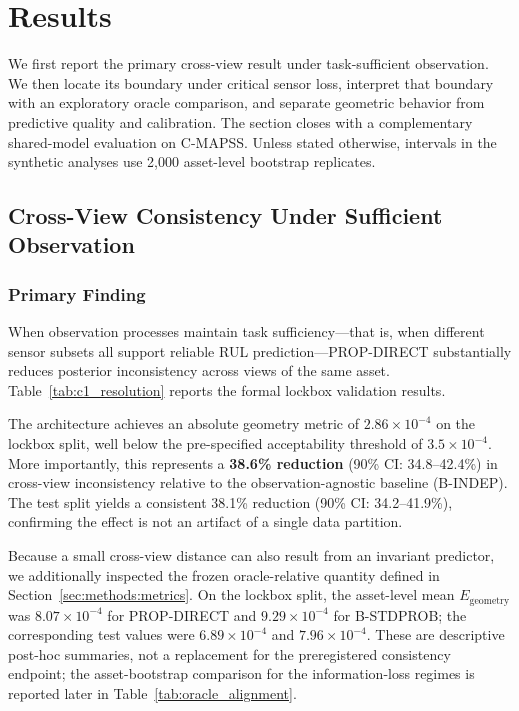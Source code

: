 
\section{Results}
\label{sec:results}

We first report the primary cross-view result under task-sufficient observation. We then locate its boundary under critical sensor loss, interpret that boundary with an exploratory oracle comparison, and separate geometric behavior from predictive quality and calibration. The section closes with a complementary shared-model evaluation on C-MAPSS. Unless stated otherwise, intervals in the synthetic analyses use 2,000 asset-level bootstrap replicates.

\subsection{Cross-View Consistency Under Sufficient Observation}
\label{sec:results:sufficient}

\subsubsection{Primary Finding}

When observation processes maintain task sufficiency---that is, when different sensor subsets all support reliable RUL prediction---PROP-DIRECT substantially reduces posterior inconsistency across views of the same asset. Table~\ref{tab:c1_resolution} reports the formal lockbox validation results.




The architecture achieves an absolute geometry metric of $2.86 \times 10^{-4}$ on the lockbox split, well below the pre-specified acceptability threshold of $3.5 \times 10^{-4}$. More importantly, this represents a \textbf{38.6\% reduction} (90\% CI: 34.8--42.4\%) in cross-view inconsistency relative to the observation-agnostic baseline (B-INDEP). The test split yields a consistent 38.1\% reduction (90\% CI: 34.2--41.9\%), confirming the effect is not an artifact of a single data partition.

Because a small cross-view distance can also result from an invariant predictor, we
additionally inspected the frozen oracle-relative quantity defined in
Section~\ref{sec:methods:metrics}. On the lockbox split, the asset-level mean
$E_{\mathrm{geometry}}$ was $8.07\times10^{-4}$ for PROP-DIRECT and
$9.29\times10^{-4}$ for B-STDPROB; the corresponding test values were
$6.89\times10^{-4}$ and $7.96\times10^{-4}$. These are descriptive post-hoc
summaries, not a replacement for the preregistered consistency endpoint; the
asset-bootstrap comparison for the information-loss regimes is reported later in
Table~\ref{tab:oracle_alignment}.

